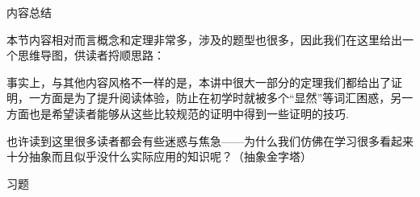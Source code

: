 \vspace{2ex}
\centerline{\heiti \Large 内容总结}

本节内容相对而言概念和定理非常多，涉及的题型也很多，因此我们在这里给出一个思维导图，供读者捋顺思路：%

事实上，与其他内容风格不一样的是，本讲中很大一部分的定理我们都给出了证明，一方面是为了提升阅读体验，防止在初学时就被多个``显然''等词汇困惑，另一方面也是希望读者能够从这些比较规范的证明中得到一些证明的技巧.

也许读到这里很多读者都会有些迷惑与焦急——为什么我们仿佛在学习很多看起来十分抽象而且似乎没什么实际应用的知识呢？（抽象金字塔）

\vspace{2ex}
\centerline{\heiti \Large 习题}

\vspace{2ex}
{\kaishu }
\begin{flushright}
    \kaishu

\end{flushright}

